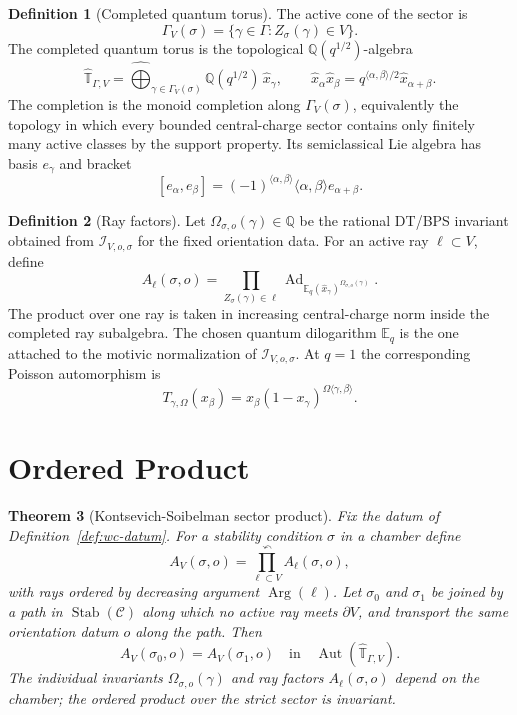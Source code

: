 \documentclass[11pt]{article}
\newtheorem{theorem}{Theorem}
\theoremstyle{definition}
\newtheorem{definition}[theorem]{Definition}
\providecommand{\Q}{\mathbb{Q}}
\providecommand{\cC}{\mathcal{C}}
\providecommand{\Aut}{\operatorname{Aut}}
\providecommand{\Ad}{\operatorname{Ad}}
\providecommand{\Stab}{\operatorname{Stab}}
\providecommand{\Arg}{\operatorname{Arg}}
\begin{document}
\begin{definition}[Completed quantum torus]
\label{def:quantum-torus}
The active cone of the sector is
\[
 \Gamma_V(\sigma)=\{\gamma\in\Gamma: Z_\sigma(\gamma)\in V\}.
\]
The completed quantum torus is the topological
$\Q(q^{1/2})$-algebra
\[
 \widehat{\mathbb T}_{\Gamma,V}
 =
 \widehat{\bigoplus}_{\gamma\in\Gamma_V(\sigma)}
 \Q(q^{1/2})\,\hat x_\gamma,
 \qquad
 \hat x_\alpha\hat x_\beta
 =
 q^{\langle\alpha,\beta\rangle/2}\hat x_{\alpha+\beta}.
\]
The completion is the monoid completion along $\Gamma_V(\sigma)$,
equivalently the topology in which every bounded central-charge sector
contains only finitely many active classes by the support property.  Its
semiclassical Lie algebra has basis $e_\gamma$ and bracket
\[
 [e_\alpha,e_\beta]
 =
 (-1)^{\langle\alpha,\beta\rangle}
 \langle\alpha,\beta\rangle e_{\alpha+\beta}.
\]
\end{definition}

\begin{definition}[Ray factors]
\label{def:ray-factors}
Let $\Omega_{\sigma,o}(\gamma)\in\Q$ be the rational DT/BPS invariant
obtained from $\mathcal I_{V,o,\sigma}$ for the fixed orientation data.
For an active ray $\ell\subset V$, define
\[
 A_\ell(\sigma,o)
 =
 \prod_{Z_\sigma(\gamma)\in\ell}
 \Ad_{\mathbb E_q(\hat x_\gamma)^{\Omega_{\sigma,o}(\gamma)}} .
\]
The product over one ray is taken in increasing central-charge norm
inside the completed ray subalgebra.  The chosen quantum dilogarithm
$\mathbb E_q$ is the one attached to the motivic normalization of
$\mathcal I_{V,o,\sigma}$.  At $q=1$ the corresponding Poisson
automorphism is
\[
 T_{\gamma,\Omega}(x_\beta)
 =
 x_\beta(1-x_\gamma)^{\Omega\langle\gamma,\beta\rangle}.
\]
\end{definition}

\section{Ordered Product}

\begin{theorem}[Kontsevich-Soibelman sector product]
\label{thm:ks-ordered-product}
Fix the datum of Definition~\ref{def:wc-datum}.  For a stability
condition $\sigma$ in a chamber define
\[
 A_V(\sigma,o)
 =
 \prod_{\ell\subset V}^{\curvearrowleft} A_\ell(\sigma,o),
\]
with rays ordered by decreasing argument $\Arg(\ell)$.  Let
$\sigma_0$ and $\sigma_1$ be joined by a path in $\Stab(\cC)$ along
which no active ray meets $\partial V$, and transport the same
orientation datum $o$ along the path.  Then
\[
 A_V(\sigma_0,o)=A_V(\sigma_1,o)
 \quad\text{in}\quad
 \Aut(\widehat{\mathbb T}_{\Gamma,V}).
\]
The individual invariants $\Omega_{\sigma,o}(\gamma)$ and ray factors
$A_\ell(\sigma,o)$ depend on the chamber; the ordered product over the
strict sector is invariant.
\end{theorem}
\end{document}
